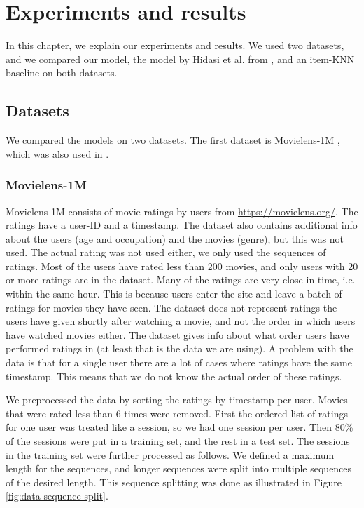 \chapter{Experiments and results}
In this chapter, we explain our experiments and results. We used two datasets, and we compared our model, the model by Hidasi et al. from \cite{DBLP:journals/corr/HidasiKBT15}, and an item-KNN baseline on both datasets.

\section{Datasets}
We compared the models on two datasets. The first dataset is Movielens-1M \cite{dataset:movielens}, which was also used in \cite{DBLP:journals/corr/LiuWWL016}.

\subsection{Movielens-1M}
Movielens-1M consists of movie ratings by users from \href{https://movielens.org/}{https://movielens.org/}. The ratings have a user-ID and a timestamp. The dataset also contains additional info about the users (age and occupation) and the movies (genre), but this was not used. The actual rating was not used either, we only used the sequences of ratings. Most of the users have rated less than 200 movies, and only users with 20 or more ratings are in the dataset. Many of the ratings are very close in time, i.e. within the same hour. This is because users enter the site and leave a batch of ratings for movies they have seen. The dataset does not represent ratings the users have given shortly after watching a movie, and not the order in which users have watched movies either. The dataset gives info about what order users have performed ratings in (at least that is the data we are using). A problem with the data is that for a single user there are a lot of cases where ratings have the same timestamp. This means that we do not know the actual order of these ratings.

We preprocessed the data by sorting the ratings by timestamp per user. Movies that were rated less than 6 times were removed. First the ordered list of ratings for one user was treated like a session, so we had one session per user. Then 80\% of the sessions were put in a training set, and the rest in a test set. The sessions in the training set were further processed as follows. We defined a maximum length for the sequences, and longer sequences were split into multiple sequences of the desired length. This sequence splitting was done as illustrated in Figure \ref{fig:data-sequence-split}.

